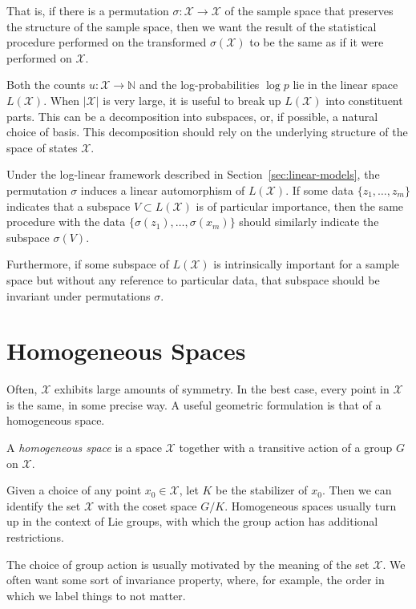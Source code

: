 \documentclass[cclicense]{hmcthesis}
\providecommand*{\xs}{\mathcal X}
\providecommand*{\N}{\mathbb{N}}
\numberwithin{equation}{chapter}
\numberwithin{thmcounter}{chapter}
\begin{document}
    That is, if there is a permutation $\sigma: \xs \to \xs$ of the sample space
    that preserves the structure of the sample space, then we want the result of
    the statistical procedure performed on the transformed $\sigma(\xs)$ to be
    the same as if it were performed on $\xs$.

    Both the counts $u: \xs \to \N$ and the log-probabilities $\log p$ lie in
    the linear space $L(\xs)$.  When $|\xs|$ is very large, it is useful to
    break up $L(\xs)$ into constituent parts.  This can be a decomposition into
    subspaces, or, if possible, a natural choice of basis.  This
    decomposition should rely on the underlying structure of the space of states
    $\xs$.

    Under the log-linear framework described in Section~\ref{sec:linear-models},
    the permutation $\sigma$ induces a linear automorphism of $L(\xs)$.  If some
    data $\{z_1, \ldots, z_m\}$ indicates that a subspace $V \subset L(\xs)$ is
    of particular importance, then the same procedure with the data
    $\{\sigma(z_1), \ldots, \sigma(x_m)\}$ should similarly indicate the
    subspace $\sigma(V)$.

    Furthermore, if some subspace of $L(\xs)$  is intrinsically important for a
    sample space but without any reference to particular data, that subspace
    should be invariant under permutations $\sigma$.

\section{Homogeneous Spaces}

    Often, $\xs$ exhibits large amounts of symmetry.  In the best case, every
    point in $\xs$ is the same, in some precise way.  A useful geometric
    formulation is that of a homogeneous space.
    \begin{definition}
        A \emph{homogeneous space} is a space $\xs$ together with a transitive
        action of a group $G$ on $\xs$.
    \end{definition}
    Given a choice of any point $x_0 \in \xs$, let $K$ be the stabilizer of
    $x_0$.  Then we can identify the set $\xs$ with the coset space $G / K$.
    Homogeneous spaces usually turn up in the context of Lie groups, with which
    the group action has additional restrictions.

    The choice of group action is usually motivated by the meaning of the set
    $\xs$.  We often want some sort of invariance property, where, for example,
    the order in which we label things to not matter.
\end{document}
